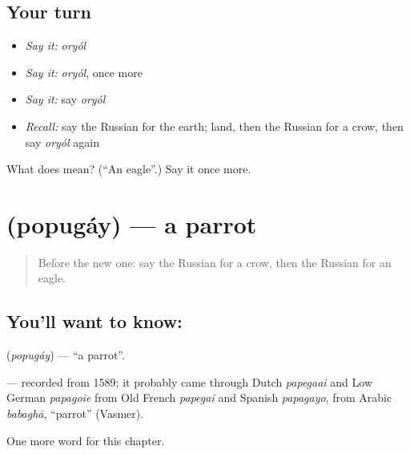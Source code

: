 \subsection*{Your turn}
\begin{itemize}
\raggedright
  \item \emph{Say it:} \emph{oryól}
  \item \emph{Say it:} \emph{oryól}, once more
  \item \emph{Say it:} say \emph{oryól}
  \item \emph{Recall:} say the Russian for the earth; land, then the Russian for a crow, then say \emph{oryól} again
\end{itemize}

\begin{tcolorbox}[breakable,colback=teal!4,colframe=teal!35!black,title={Before you move on}]
What does  mean? (\textquotedblleft{}An eagle\textquotedblright{}.) Say it once more.
\end{tcolorbox}
\section[\texorpdfstring{\ru{попугай} (popugáy)}{попугай (popugáy)}]{ (popugáy) — a parrot}

\label{lesson:RU-C165-popugay}



\begin{quote}
Before the new one: say the Russian for a crow, then the Russian for an eagle.
\end{quote}

\subsection*{You'll want to know: }
\textbf{} (\emph{popugáy}) — \textquotedblleft{}a parrot\textquotedblright{}.

\begin{cousinweb}
\textbf{} — recorded from 1589; it probably came through Dutch \emph{papegaai} and Low German \emph{papagoie} from Old French \emph{papegai} and Spanish \emph{papagayo}, from Arabic \emph{babaghā}, \textquotedblleft{}parrot\textquotedblright{} (Vasmer).
\end{cousinweb}

\begin{grammarlens}[title={What you've built}]
One more word for this chapter.
\end{grammarlens}

